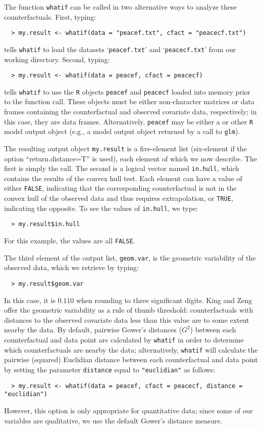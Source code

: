 \documentclass[oneside,letterpaper,titlepage]{article}
\newcommand{\hlink}{\htmladdnormallink}
\begin{document}
The function \texttt{whatif} can be called in two alternative ways
to analyze these counterfactuals.  First, typing:
  \begin{verbatim}
  > my.result <- whatif(data = "peacef.txt", cfact = "peacecf.txt") 
  \end{verbatim}
tells \texttt{whatif} to load the datasets `\texttt{peacef.txt}' and
`\texttt{peacecf.txt}' from our working directory.
Second, typing:
  \begin{verbatim}
  > my.result <- whatif(data = peacef, cfact = peacecf) 
  \end{verbatim}
tells \texttt{whatif} to use the \texttt{R} objects \texttt{peacef}
and \texttt{peacecf} loaded into memory prior to the function call.
These objects must be either non-character matrices or data frames
containing the counterfactual and observed covariate data,
respectively; in this case, they are data frames.  Alternatively, \texttt{peacef}
may be either a \hlink{Zelig}{/zelig} or other \texttt{R} model output
object (e.g., a model output object returned by a call to
\texttt{glm}).

The resulting output object \texttt{my.result} is a five-element list
(six-element if the option ``return.distance=T'' is used), each element of
which we now describe.  The first is simply the call.  The second is a
logical vector named \texttt{in.hull}, which contains the results of
the convex hull test.  Each element can have a value of either
\texttt{FALSE}, indicating that the corresponding counterfactual is
not in the convex hull of the observed data and thus requires
extrapolation, or \texttt{TRUE}, indicating the opposite.  To see the
values of \texttt{in.hull}, we type:
  \begin{verbatim}
  > my.result$in.hull 
  \end{verbatim} %
For this example, the values are all \texttt{FALSE}.

The third element of the output list, \texttt{geom.var}, is the geometric
variability of the observed data, which we retrieve by typing:
  \begin{verbatim}
  > my.result$geom.var 
  \end{verbatim} %
In this case, it is $0.110$ when rounding to three significant digits.
King and Zeng offer the geometric variability as a rule of thumb
threshold: counterfactuals with distances to the observed covariate
data less than this value are to some extent nearby the data.  By
default, pairwise Gower's distances ($G^{2}$) between each
counterfactual and data point are calculated by \texttt{whatif} in order
to determine which counterfactuals are nearby the data; alternatively, 
\texttt{whatif} will calculate the pairwise (squared) Euclidian
distance between each counterfactual and data point by setting the
parameter \texttt{distance} equal to \texttt{"euclidian"} as follows:
  \begin{verbatim}
  > my.result <- whatif(data = peacef, cfact = peacecf, distance = "euclidian")
  \end{verbatim}
However, this option is only appropriate for quantitative data; since
some of our variables are qualitative, we use the default Gower's
distance measure.  
\end{document}
